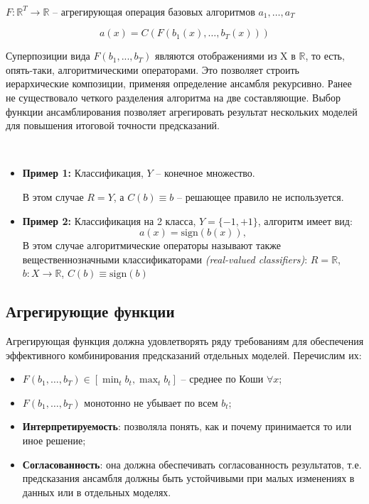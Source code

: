 \ \

$F: \mathbb{R}^T \to \mathbb{R}$ – агрегирующая операция базовых алгоритмов $a_1, \dots, a_T$

$$a(x) = C(F(b_1(x), \dots, b_T(x)))$$


Суперпозиции вида $F(b_1, ... , b_T )$ являются отображениями из X в $\mathbb{R}$, то есть, опять-таки, алгоритмическими операторами. Это позволяет строить иерархические композиции, применяя определение ансамбля рекурсивно.
Ранее не существовало четкого разделения алгоритма на две составляющие. Выбор функции ансамблирования позволяет  агрегировать результат нескольких моделей для повышения итоговой точности предсказаний.

\ \
\begin{itemize}
    \item \textbf{Пример 1:} Классификация, $Y$ – конечное множество.

          В этом случае $R = Y$, а $C(b) \equiv b$ – решающее правило не используется.
    \item \textbf{Пример 2:} Классификация на 2 класса, $Y = \{-1, +1\}$, алгоритм имеет вид:
          $$a(x) = \text{sign}(b(x)),$$
          В этом случае алгоритмические операторы называют также вещественнозначными классификаторами \textit{(real-valued classifiers)}: $R = \mathbb{R}$, $b: X \to \mathbb{R}$, $C(b) \equiv \text{sign}(b)$
\end{itemize}

\subsection{Агрегирующие функции}
Агрегирующая функция должна удовлетворять ряду требованиям для обеспечения эффективного комбинирования предсказаний отдельных моделей. Перечислим их:
\begin{itemize}
    \item $F(b_1, \dots, b_T) \in [\min_t b_t, \max_t b_t]$ – среднее по Коши $\forall x$;
    \item $F(b_1, \dots, b_T)$ монотонно не убывает по всем $b_t$;
    \item \textbf{Интерпретируемость}: позволяла понять, как и почему принимается то или иное решение;
    \item  \textbf{Согласованность}: она должна обеспечивать согласованность результатов, т.е. предсказания ансамбля должны быть устойчивыми при малых изменениях в данных или в отдельных моделях.
\end{itemize}

